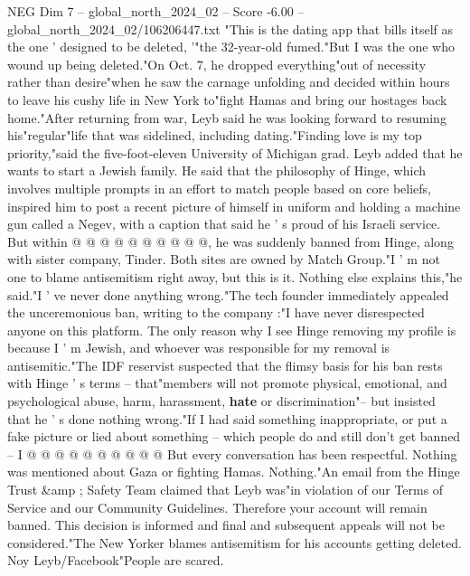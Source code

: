 \begin{textsample}{NEG Dim 7 – global\_north\_2024\_02 – Score -6.00 – global\_north\_2024\_02/106206447.txt}  \label{ex:f7_neg_286}
"This is the dating app that bills itself as the one ' designed to be deleted, '"the 32-year-old fumed."But I was the one who wound up being deleted."On Oct. 7, he dropped everything"out of necessity rather than desire"when he saw the carnage unfolding and decided within hours to leave his cushy life in New York to"fight Hamas and bring our hostages back home."After returning from war, Leyb said he was looking forward to resuming his"regular"life that was sidelined, including dating."Finding love is my top priority,"said the five-foot-eleven University of Michigan grad.
Leyb added that he wants to start a Jewish family.
He said that the philosophy of Hinge, which involves multiple prompts in an effort to match people based on core beliefs, inspired him to post a recent picture of himself in uniform and holding a machine gun called a Negev, with a caption that said he ' s proud of his Israeli service.
But within @ @ @ @ @ @ @ @ @ @, he was suddenly banned from Hinge, along with sister company, Tinder.
Both sites are owned by Match Group."I ' m not one to blame antisemitism right away, but this is it.
Nothing else explains this,"he said."I ' ve never done anything wrong."The tech founder immediately appealed the unceremonious ban, writing to the company :"I have never disrespected anyone on this platform.
The only reason why I see Hinge removing my profile is because I ' m Jewish, and whoever was responsible for my removal is antisemitic."The IDF reservist suspected that the flimsy basis for his ban rests with Hinge ' s terms -- that"members will not promote physical, emotional, and psychological abuse, harm, harassment, \textbf{hate} or discrimination"-- but insisted that he ' s done nothing wrong."If I had said something inappropriate, or put a fake picture or lied about something -- which people do and still don't get banned -- I @ @ @ @ @ @ @ @ @ @ But every conversation has been respectful.
Nothing was mentioned about Gaza or fighting Hamas.
Nothing."An email from the Hinge Trust \&amp ; Safety Team claimed that Leyb was"in violation of our Terms of Service and our Community Guidelines.
Therefore your account will remain banned.
This decision is informed and final and subsequent appeals will not be considered."The New Yorker blames antisemitism for his accounts getting deleted.
Noy Leyb/Facebook"People are scared.

\end{textsample}
